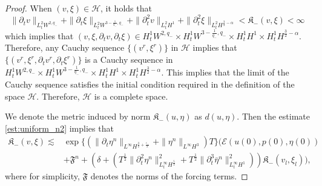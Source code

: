 \documentclass[letterpaper,reqno,10pt,twoside]{amsart}
\theoremstyle{definition}
\theoremstyle{remark}
\def\p{\partial}
\begin{document}
\begin{proof}
{{				When $(v,\xi)\in \mathscr{H}$, it holds that
				\[
				\|\p_{t}v\|_{L_{t}^{2}W^{2,q_{-}}}+\|\p_{t}\xi\|_{L_{t}^{2}W^{3-\frac{1}{q_{-}},q_{-}}}+\|\p_{t}^{2}v\|_{L_{t}^{2}H^{1}}+\|\p_{t}^{2}\xi\|_{L_{t}^{2}H^{\frac{3}{2}-\alpha}}<\mathfrak{K}_{-}(v,\xi)<\infty
				\]
				which implies that
				$(v,\xi,\p_{t}v,\p_{t}\xi)\in H_{t}^{1}W^{2,q_{-}} \times H_{t}^{1}W^{3-\frac{1}{q_{-}},q_{-}}\times H_{t}^{1}H^{1}\times H_{t}^{1}H^{\frac{3}{2}-\alpha}$.
				Therefore, any Cauchy sequence $\{(v^{r},\xi^{r})\}$ in $\mathscr{H}$ implies that $\{(v^{r},\xi^{r},\p_{t}v^{r},\p_{t}\xi^{r})\}$ is a Cauchy sequence in 
				$H_{t}^{1}W^{2,q_{-}} \times H_{t}^{1}W^{3-\frac{1}{q_{-}},q_{-}}\times H_{t}^{1}H^{1}\times H_{t}^{1}H^{\frac{3}{2}-\alpha}$.
				This implies that the limit of the Cauchy sequence satisfies the initial condition required in the definition of the space $\mathscr{H}$. Therefore, $\mathscr{H}$ is a complete space.
			}
			
			We denote the metric induced by norm $\mathfrak{K}_{-}(u,\eta)$ as $d(u,\eta)$. Then the estimate \eqref{est:uniform_n2} implies that
			\[
			\begin{aligned}
				\mathfrak{K}_{-}(v,\xi )\lesssim& \exp\{(\|\p_{t}\eta^{n}\|_{L^{\infty}H^{\frac{3}{2}+\frac{\varepsilon_{-}}{2}}}+\|\eta^{n}\|_{L^{\infty}H^{3}})T\}\big(\mathscr{E}(u(0),p(0),\eta(0))\\
				&+ \mathfrak{F}^n +(\delta+(T^{\frac{1}{2}}\|\p_{t}^{2}\eta^{n}\|^{2}_{L_{t}^{\infty}H^{\frac{5}{2}}}+T^{\frac{1}{2}}\|\p_{t}^{3}\bar{\eta}^{n}\|_{L_{t}^{\infty}H^{1}}^{2})) \mathfrak{K}_{-}(v_{l},\xi_{l})\big),
			\end{aligned}
			\]
			\noindent where for simplicity, $\mathfrak{F}$ denotes the norms of the forcing terms.
			
}
\end{proof}
\end{document}
